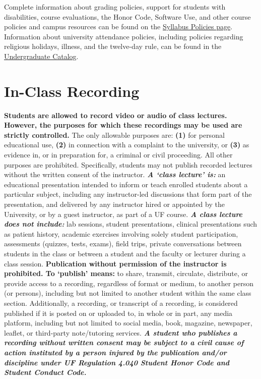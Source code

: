 \documentclass[
  12pt,
  letterpaper,
  DIV=11,
  numbers=noendperiod]{scrreprt}
\begin{document}
Complete information about grading policies, support for students with
disabilities, course evaluations, the Honor Code, Software Use, and
other course policies and campus resources can be found on the
\href{https://syllabus.ufl.edu/syllabus-policy/uf-syllabus-policy-links/}{Syllabus
Policies page}. Information about university attendance policies,
including policies regarding religious holidays, illness, and the
twelve-day rule, can be found in the
\href{https://catalog.ufl.edu/UGRD/academic-regulations/attendance-policies/\#absencestext}{Undergraduate
Catalog}.

\section*{In-Class Recording}\label{in-class-recording}

\textbf{Students are allowed to record video or audio of class lectures.
However, the purposes for which these recordings may be used are
strictly controlled.} The only allowable purposes are: \textbf{(1)} for
personal educational use, \textbf{(2)} in connection with a complaint to
the university, or \textbf{(3)} as evidence in, or in preparation for, a
criminal or civil proceeding. All other purposes are prohibited.
Specifically, students may not publish recorded lectures without the
written consent of the instructor. \textbf{\emph{A `class lecture' is:}}
an educational presentation intended to inform or teach enrolled
students about a particular subject, including any instructor-led
discussions that form part of the presentation, and delivered by any
instructor hired or appointed by the University, or by a guest
instructor, as part of a UF course. \textbf{\emph{A class lecture does
not include:}} lab sessions, student presentations, clinical
presentations such as patient history, academic exercises involving
solely student participation, assessments (quizzes, tests, exams), field
trips, private conversations between students in the class or between a
student and the faculty or lecturer during a class session.
\textbf{Publication without permission of the instructor is prohibited.
To `publish' means:} to share, transmit, circulate, distribute, or
provide access to a recording, regardless of format or medium, to
another person (or persons), including but not limited to another
student within the same class section. Additionally, a recording, or
transcript of a recording, is considered published if it is posted on or
uploaded to, in whole or in part, any media platform, including but not
limited to social media, book, magazine, newspaper, leaflet, or
third-party note/tutoring services. \textbf{\emph{A student who
publishes a recording without written consent may be subject to a civil
cause of action instituted by a person injured by the publication and/or
discipline under UF Regulation 4.040 Student Honor Code and Student
Conduct Code.}}
\end{document}
